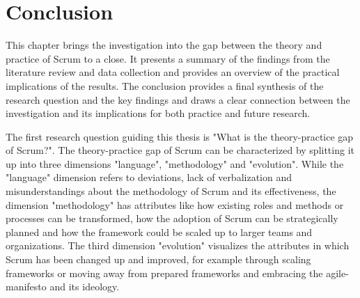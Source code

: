 \chapter{Conclusion}\label{cha:Conclusion}
This chapter brings the investigation into the gap between the theory and practice of Scrum to a close. It presents a summary of the findings from the literature review and data collection and provides an overview of the practical implications of the results. The conclusion provides a final synthesis of the research question and the key findings and draws a clear connection between the investigation and its implications for both practice and future research.

The first research question guiding this thesis is "What is the theory-practice gap of Scrum?". The theory-practice gap of Scrum can be characterized by splitting it up into three dimensions "language", "\gls{methodology}" and "evolution". While the "language" dimension refers to deviations, lack of verbalization and misunderstandings about the \gls{methodology} of Scrum and its effectiveness, the dimension "\gls{methodology}" has attributes like how existing roles and \glspl{method} or processes can be transformed, how the \gls{adoption} of Scrum can be strategically planned and how the \gls{framework} could be scaled up to larger teams and organizations. The third dimension "evolution" visualizes the attributes in which Scrum has been changed up and improved, for example through scaling \glspl{framework} or moving away from prepared \glspl{framework} and embracing the \ac{agile-manifesto} and its \gls{ideology}.  


